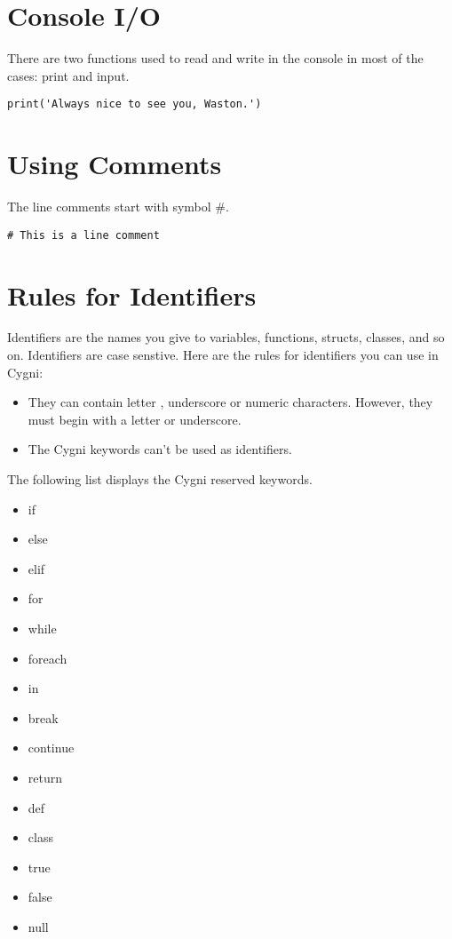 \section{Console I/O}
There are two functions used to read and write in the console in most of the cases: print and input. 
\begin{lstlisting}
print('Always nice to see you, Waston.')
\end{lstlisting}

\section{Using Comments}
The line comments start with symbol \#.
\begin{lstlisting}
# This is a line comment
\end{lstlisting}

\section{Rules for Identifiers}
Identifiers are the names you give to variables, functions, structs, classes, and so on. Identifiers are case senstive. Here are the rules for identifiers you can use in Cygni:
\begin{itemize}
	\item They can contain letter , underscore or numeric characters. However, they must begin with a letter or underscore.
	\item The Cygni keywords can't be used as identifiers.
\end{itemize}

The following list displays the Cygni reserved keywords.
\begin{itemize}
	\item if
	\item else
	\item elif
	\item for
	\item while
	\item foreach
	\item in
	\item break
	\item continue
	\item return
	\item def
	\item class
	\item true
	\item false
	\item null
\end{itemize}
